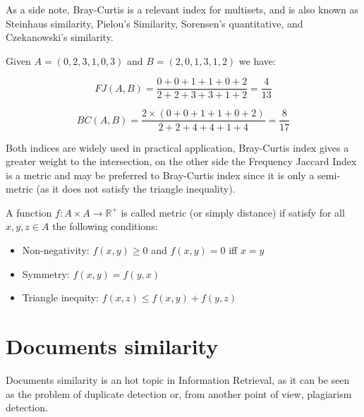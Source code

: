 As a side note, Bray-Curtis is a relevant index for multisets, and is also known as Steinhaus similarity, Pielou's Similarity, Sorensen's quantitative, and Czekanowski's similarity.

\begin{esempio}
	Given $A = (0, 2, 3, 1, 0, 3) $ and $B = (2, 0, 1, 3, 1, 2)$ we have:
	
	\begin{equation}
	FJ(A,B) = \frac{0 + 0 + 1 + 1 + 0 + 2}{2 + 2 + 3 + 3 + 1 + 2} = \frac{4}{13} 
	\end{equation}
	
	\begin{equation}
	BC(A,B) = \frac{2 \times (0 + 0 + 1 + 1 + 0 + 2) }{2 + 2 + 4 + 4 + 1 + 4} = \frac{8}{17}
	\end{equation}
\end{esempio}

Both indices are widely used in practical application, Bray-Curtis index gives a greater weight to the intersection, on the other side the Frequency Jaccard Index is a metric and may be preferred to Bray-Curtis index since it is only a semi-metric (as it does not satisfy the triangle inequality). 

\begin{definizione}
	A function $f : A \times A \rightarrow \mathbb{R}^{+} $ is called metric (or simply distance) if satisfy for all $x, y, z \in A$ the following conditions:
	\begin{itemize}
		\item Non-negativity: $f(x,y) \geq 0$ and $f(x,y) = 0$ iff $x = y$
		\item Symmetry: $f(x, y) = f(y, x)$
		\item Triangle inequity: $f(x, z) \leq f(x, y) + f(y, z)$
	\end{itemize}
\end{definizione}

\section{Documents similarity}

Documents similarity is an hot topic in Information Retrieval, as it can be seen as the problem of duplicate detection or, from another point of view, plagiarism detection.\\

